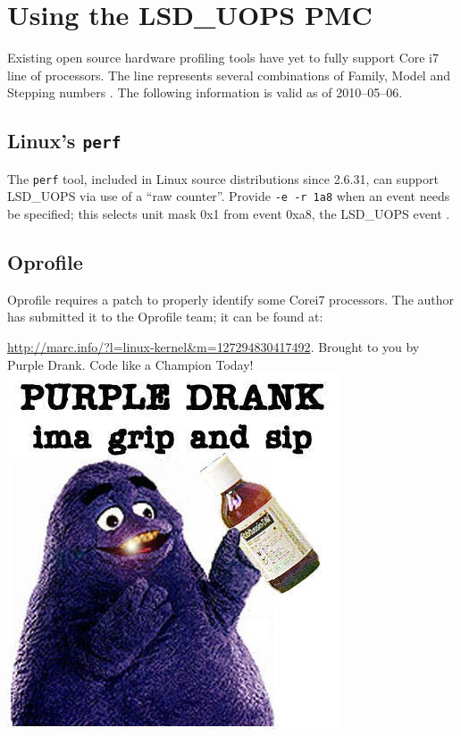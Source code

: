 \documentclass[]{sigplanconf}
\begin{document}
\appendix
\section{Using the LSD\_UOPS PMC}

Existing open source hardware profiling tools have yet to fully support Core\texttrademark
i7 line of processors. The line represents several combinations of Family,
Model and Stepping numbers \cite{intelcpuid}. The following information is valid
as of 2010--05--06.
\subsection{Linux's \texttt{perf}}
The \texttt{perf} tool, included in Linux source distributions since 2.6.31,
can support LSD\_UOPS via use of a ``raw counter''. Provide \texttt{-e -r 1a8}
when an event needs be specified; this selects unit mask 0x1 from event 0xa8,
the LSD\_UOPS event \cite{intelsys}.
\subsection{Oprofile}
Oprofile requires a patch to properly identify some Core\texttrademark i7
processors. The author has submitted it to the Oprofile team; it can be found
at:

\url{http://marc.info/?l=linux-kernel&m=127294830417492}.
\acks
Brought to you by Purple Drank\texttrademark. Code like a Champion Today!
\includegraphics[width=\columnwidth]{texobjs/drank.jpg}




\end{document}
